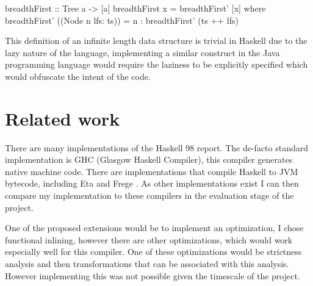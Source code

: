 \documentclass[float=false, crop=false]{standalone}
\begin{document}
\begin{minipage}{\linewidth}
\begin{HaskellLst}
breadthFirst :: Tree a -> [a]
breadthFirst x = breadthFirst' [x]
  where
    breadthFirst' ((Node n lfs: ts)) =
      n : breadthFirst' (ts ++ lfs)
\end{HaskellLst}
\end{minipage}
This definition of an infinite length data structure is trivial in 
Haskell due to the lazy nature of the language, implementing
a similar construct in the Java programming language would 
require the laziness to be explicitly specified which 
would obfuscate the intent of the code. 





  

\section{Related work}

There are many implementations of the Haskell 98 report.
The de-facto standard implementation is GHC \cite{ghc} (Glasgow Haskell
Compiler), this compiler generates native machine code. There
are implementations that compile Haskell to JVM bytecode, including Eta \cite{eta} and Frege \cite{frege}. 
As other implementations exist I can then 
compare my implementation to these compilers in the evaluation stage
of the project. 

One of the proposed extensions would be to implement an optimization,
I chose functional inlining, however there are other optimizations, which
would work especially well for this compiler. One of these
optimizations would be strictness analysis and
then transformations that can be associated with this analysis. 
However implementing this was not possible given the timescale of the project.
\end{document}

